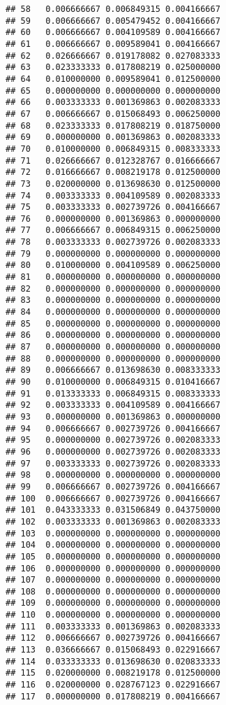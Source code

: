 \documentclass[
]{article}
\begin{document}
\begin{verbatim}
## 58   0.006666667 0.006849315 0.004166667
## 59   0.006666667 0.005479452 0.004166667
## 60   0.006666667 0.004109589 0.004166667
## 61   0.006666667 0.009589041 0.004166667
## 62   0.026666667 0.019178082 0.027083333
## 63   0.023333333 0.017808219 0.025000000
## 64   0.010000000 0.009589041 0.012500000
## 65   0.000000000 0.000000000 0.000000000
## 66   0.003333333 0.001369863 0.002083333
## 67   0.006666667 0.015068493 0.006250000
## 68   0.023333333 0.017808219 0.018750000
## 69   0.000000000 0.001369863 0.002083333
## 70   0.010000000 0.006849315 0.008333333
## 71   0.026666667 0.012328767 0.016666667
## 72   0.016666667 0.008219178 0.012500000
## 73   0.020000000 0.013698630 0.012500000
## 74   0.003333333 0.004109589 0.002083333
## 75   0.003333333 0.002739726 0.004166667
## 76   0.000000000 0.001369863 0.000000000
## 77   0.006666667 0.006849315 0.006250000
## 78   0.003333333 0.002739726 0.002083333
## 79   0.000000000 0.000000000 0.000000000
## 80   0.010000000 0.004109589 0.006250000
## 81   0.000000000 0.000000000 0.000000000
## 82   0.000000000 0.000000000 0.000000000
## 83   0.000000000 0.000000000 0.000000000
## 84   0.000000000 0.000000000 0.000000000
## 85   0.000000000 0.000000000 0.000000000
## 86   0.000000000 0.000000000 0.000000000
## 87   0.000000000 0.000000000 0.000000000
## 88   0.000000000 0.000000000 0.000000000
## 89   0.006666667 0.013698630 0.008333333
## 90   0.010000000 0.006849315 0.010416667
## 91   0.013333333 0.006849315 0.008333333
## 92   0.003333333 0.004109589 0.004166667
## 93   0.000000000 0.001369863 0.000000000
## 94   0.006666667 0.002739726 0.004166667
## 95   0.000000000 0.002739726 0.002083333
## 96   0.000000000 0.002739726 0.002083333
## 97   0.003333333 0.002739726 0.002083333
## 98   0.000000000 0.000000000 0.000000000
## 99   0.006666667 0.002739726 0.004166667
## 100  0.006666667 0.002739726 0.004166667
## 101  0.043333333 0.031506849 0.043750000
## 102  0.003333333 0.001369863 0.002083333
## 103  0.000000000 0.000000000 0.000000000
## 104  0.000000000 0.000000000 0.000000000
## 105  0.000000000 0.000000000 0.000000000
## 106  0.000000000 0.000000000 0.000000000
## 107  0.000000000 0.000000000 0.000000000
## 108  0.000000000 0.000000000 0.000000000
## 109  0.000000000 0.000000000 0.000000000
## 110  0.000000000 0.000000000 0.000000000
## 111  0.003333333 0.001369863 0.002083333
## 112  0.006666667 0.002739726 0.004166667
## 113  0.036666667 0.015068493 0.022916667
## 114  0.033333333 0.013698630 0.020833333
## 115  0.020000000 0.008219178 0.012500000
## 116  0.020000000 0.028767123 0.022916667
## 117  0.000000000 0.017808219 0.004166667

\end{verbatim}
\end{document}
